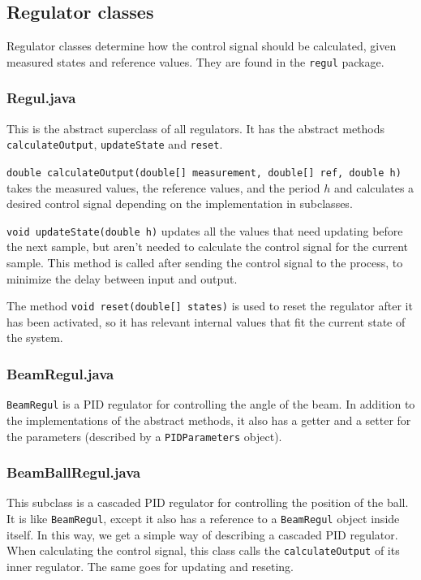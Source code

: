 



\subsection{Regulator classes}
Regulator classes determine how the control signal should be calculated, given measured states and reference values. They are found in the \texttt{regul} package.

\subsubsection{Regul.java}
This is the abstract superclass of all regulators. It has the abstract methods \texttt{calculateOutput}, \texttt{updateState} and \texttt{reset}.

\texttt{double calculateOutput(double[] measurement, double[] ref, double h)} takes the measured values, the reference values, and the period $h$ and calculates a desired control signal depending on the implementation in subclasses.

\texttt{void updateState(double h)} updates all the values that need updating before the next sample, but aren't needed to calculate the control signal for the current sample. This method is called after sending the control signal to the process, to minimize the delay between input and output.

The method \texttt{void reset(double[] states)} is used to reset the regulator after it has been activated, so it has relevant internal values that fit the current state of the system.

\subsubsection{BeamRegul.java}
\texttt{BeamRegul} is a PID regulator for controlling the angle of the beam. In addition to the implementations of the abstract methods, it also has a getter and a setter for the parameters (described by a \texttt{PIDParameters} object).

\subsubsection{BeamBallRegul.java}
This subclass is a cascaded PID regulator for controlling the position of the ball. It is like \texttt{BeamRegul}, except it also has a reference to a \texttt{BeamRegul} object inside itself. In this way, we get a simple way of describing a cascaded PID regulator. When calculating the control signal, this class calls the \texttt{calculateOutput} of its inner regulator. The same goes for updating and reseting.

